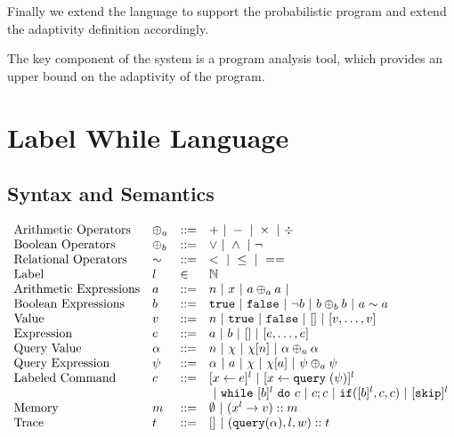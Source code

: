 \documentclass[a4paper,11pt]{article}
\begin{document}
Finally we extend the language to support the probabilistic program and extend the adaptivity definition accordingly.


The key component of the system is a program analysis tool, which provides an upper bound on the adaptivity of the program.

\section{Label While Language}
\label{sec:while_language}
%
\subsection{Syntax and Semantics}
%
\[
\begin{array}{llll}
 \mbox{Arithmetic Operators} & \oplus_a & ::= & + ~|~ - ~|~ \times 
%
~|~ \div \\  
  \mbox{Boolean Operators} & \oplus_b & ::= & \lor ~|~ \land ~|~ \neg\\
   \mbox{Relational Operators} & \sim & ::= & < ~|~ \leq ~|~ == \\  
   \mbox{Label} & l & \in &  \mathbb{N}  \\  
\mbox{Arithmetic Expressions} & \aexpr & ::= & 
	n ~|~ x ~|~ \aexpr \oplus_a \aexpr ~|~ \\
\mbox{Boolean Expressions} & \bexpr & ::= & 
	\etrue ~|~ \efalse  ~|~ \neg \bexpr
	 ~|~ \bexpr \oplus_b \bexpr
	~|~ \aexpr \sim \aexpr \\
%
\mbox{Value} 
& v & ::= & { n \sep \etrue \sep \efalse ~|~ [] ~|~ [v, \dots, v]}  
\\
%
\mbox{Expression} 
& \expr & ::= & {\aexpr \sep \bexpr ~|~ [] ~|~ [\expr, \dots, \expr]} 
\\
%
\mbox{Query Value} & \qval & ::= 
& { n ~|~ \chi ~|~ \chi[n] ~|~ \qval \oplus_a  \qval }
\\
%
\mbox{Query Expression} 
& \qexpr & ::= 
& { \qval ~|~ \aexpr ~|~ \chi ~|~ \chi[\aexpr] ~|~ \qexpr \oplus_a \qexpr} 
\\
\mbox{{Labeled Command}} & c & ::= 
	&   [\assign x \expr]^{l} ~|~  [\assign x \query(\qexpr)]^{l}
	\\
 	& & & ~|~  \ewhile ~ [b]^l ~ \edo ~ c  ~|~ c;c  ~|~ \eif([\bexpr]^l, c, c) 	 ~|~ [\eskip]^{l} 
 \\
\mbox{Memory} 
& m & ::= & \emptyset ~|~ (x^{l} \to v) :: m 
\\
%
\mbox{Trace} 
& t & ::= & [] ~|~ {{( \query(\qval), l, w) :: t}} 
\\

\end{array}\]
\end{document}
